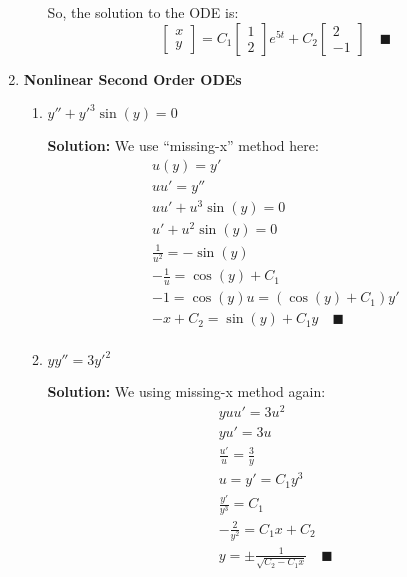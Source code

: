 \documentclass[letterpaper, fontsize=10pt]{scrartcl} %
\numberwithin{equation}{section} %
\numberwithin{figure}{section} %
\numberwithin{table}{section} %
\begin{document}
\begin{enumerate}
\begin{enumerate}[label=(\alph*)]
So, the solution to the ODE is:
\[ \begin{bmatrix} x \\ y \end{bmatrix} = C_1 \begin{bmatrix} 1 \\ 2 \end{bmatrix} e^{5t} + C_2 \begin{bmatrix} 2 \\ -1 \end{bmatrix}  \quad\blacksquare \]


\end{enumerate}

\item \textbf{Nonlinear Second Order ODEs}
\begin{enumerate}[label=(\alph*)]
\item $y''+y'^3\sin(y)=0$
\par \textbf{Solution:} We use ``missing-x'' method here:
\begin{gather*}
u(y) = y' \\
u u' = y'' \\
u u' + u^3 \sin(y) = 0 \\
u' + u^2 \sin (y) = 0\\
\frac{1}{u^2} = - \sin (y) \\
-\frac{1}{u} = \cos(y) + C_1 \\
-1 = \cos(y) u = (\cos(y) +C_1)y' \\
-x +C_2 = \sin(y) + C_1y \quad\blacksquare \\
\end{gather*}

\item $yy'' = 3y'^2$
\par \textbf{Solution:} We using missing-x method again:
\begin{gather*}
yuu' = 3u^2 \\
yu' = 3u \\
\frac{u'}{u} = \frac{3}{y} \\
u = y' = C_1 y^3 \\
\frac{y'}{y^3} = C_1 \\
-\frac{2}{y^2} = C_1 x + C_2 \\
y = \pm \frac{1}{ \sqrt{C_2 - C_1 x}} \quad\blacksquare
\end{gather*}


\end{enumerate}
\end{enumerate}
\end{document}
